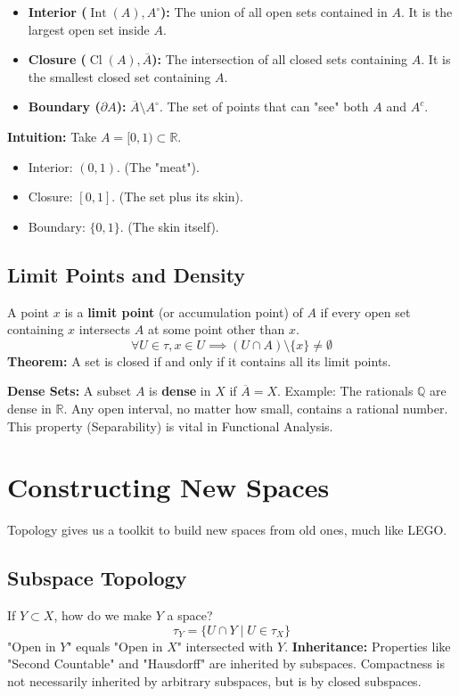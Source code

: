 \begin{definition}
\begin{itemize}
    \item \textbf{Interior ($\operatorname{Int}(A), A^\circ$):} The union of all open sets contained in $A$. It is the largest open set inside $A$.
    \item \textbf{Closure ($\operatorname{Cl}(A), \overline{A}$):} The intersection of all closed sets containing $A$. It is the smallest closed set containing $A$.
    \item \textbf{Boundary ($\partial A$):} $\overline{A} \setminus A^\circ$. The set of points that can "see" both $A$ and $A^c$.
\end{itemize}
\end{definition}

\textbf{Intuition:}
Take $A = [0, 1) \subset \mathbb{R}$.
\begin{itemize}
    \item Interior: $(0, 1)$. (The "meat").
    \item Closure: $[0, 1]$. (The set plus its skin).
    \item Boundary: $\{0, 1\}$. (The skin itself).
\end{itemize}

\subsection{Limit Points and Density}
A point $x$ is a \textbf{limit point} (or accumulation point) of $A$ if every open set containing $x$ intersects $A$ at some point other than $x$.
\[ \forall U \in \tau, x \in U \implies (U \cap A) \setminus \{x\} \neq \emptyset \]
\textbf{Theorem:} A set is closed if and only if it contains all its limit points.

\textbf{Dense Sets:} A subset $A$ is \textbf{dense} in $X$ if $\overline{A} = X$.
Example: The rationals $\mathbb{Q}$ are dense in $\mathbb{R}$. Any open interval, no matter how small, contains a rational number. This property (Separability) is vital in Functional Analysis.

\section{Constructing New Spaces}

Topology gives us a toolkit to build new spaces from old ones, much like LEGO.

\subsection{Subspace Topology}
If $Y \subset X$, how do we make $Y$ a space?
\[ \tau_Y = \{ U \cap Y \mid U \in \tau_X \} \]
"Open in $Y$" equals "Open in $X$" intersected with $Y$.
\textbf{Inheritance:} Properties like "Second Countable" and "Hausdorff" are inherited by subspaces. Compactness is not necessarily inherited by arbitrary subspaces, but is by closed subspaces.

